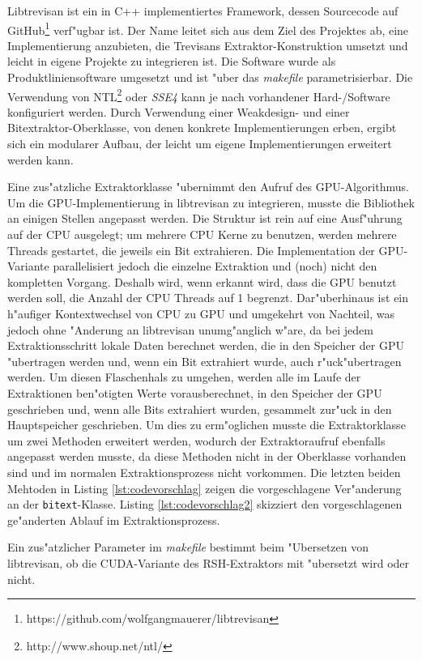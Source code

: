 Libtrevisan ist ein in C++ implementiertes Framework, dessen Sourcecode auf GitHub\footnote{https://github.com/wolfgangmauerer/libtrevisan} verf"ugbar ist. Der Name leitet sich aus dem Ziel des Projektes ab, eine Implementierung anzubieten, die Trevisans Extraktor-Konstruktion umsetzt und leicht in eigene Projekte zu integrieren ist. Die Software wurde als Produktliniensoftware umgesetzt und ist "uber das \emph{makefile} parametrisierbar. Die Verwendung von NTL\footnote{http://www.shoup.net/ntl/} oder \emph{SSE4} kann je nach vorhandener Hard-/Software konfiguriert werden. Durch Verwendung einer Weakdesign- und einer Bitextraktor-Oberklasse, von denen konkrete Implementierungen erben, ergibt sich ein modularer Aufbau, der leicht um eigene Implementierungen erweitert werden kann.

Eine zus"atzliche Extraktorklasse "ubernimmt den Aufruf des GPU-Algorithmus. Um die GPU-Implementierung in libtrevisan zu integrieren, musste die Bibliothek an einigen Stellen angepasst werden. Die Struktur ist rein auf eine Ausf"uhrung auf der CPU ausgelegt; um mehrere CPU Kerne zu benutzen, werden mehrere Threads gestartet, die jeweils ein Bit extrahieren. Die Implementation der GPU-Variante parallelisiert jedoch die einzelne Extraktion und (noch) nicht den kompletten Vorgang. Deshalb wird, wenn erkannt wird, dass die GPU benutzt werden soll, die Anzahl der CPU Threads auf 1 begrenzt. Dar"uberhinaus ist ein h"aufiger Kontextwechsel von CPU zu GPU und umgekehrt von Nachteil, was jedoch ohne "Anderung an libtrevisan unumg"anglich w"are, da bei jedem Extraktionsschritt lokale Daten berechnet werden, die in den Speicher der GPU "ubertragen werden und, wenn ein Bit extrahiert wurde, auch r"uck"ubertragen werden. Um diesen Flaschenhals zu umgehen, werden alle im Laufe der Extraktionen ben"otigten Werte vorausberechnet, in den Speicher der GPU geschrieben und, wenn alle Bits extrahiert wurden, gesammelt zur"uck in den Hauptspeicher geschrieben. Um dies zu erm"oglichen musste die Extraktorklasse um zwei Methoden erweitert werden, wodurch der Extraktoraufruf ebenfalls angepasst werden musste, da diese Methoden nicht in der Oberklasse vorhanden sind und im normalen Extraktionsprozess nicht vorkommen. Die letzten beiden Mehtoden in Listing \ref{lst:codevorschlag} zeigen die vorgeschlagene Ver"anderung an der \texttt{bitext}-Klasse. Listing \ref{lst:codevorschlag2} skizziert den vorgeschlagenen ge"anderten Ablauf im Extraktionsprozess.

Ein zus"atzlicher Parameter im \emph{makefile} bestimmt beim "Ubersetzen von libtrevisan, ob die CUDA-Variante des RSH-Extraktors mit "ubersetzt wird oder nicht.